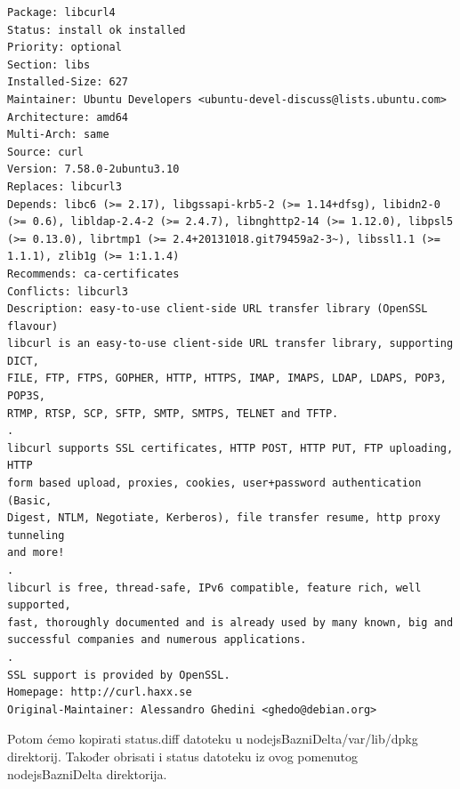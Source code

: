 \documentclass[12pt,vi]{mitthesis}
\begin{document}
\begin{lstlisting}[style=BashInputStyle]
Package: libcurl4
Status: install ok installed
Priority: optional
Section: libs
Installed-Size: 627
Maintainer: Ubuntu Developers <ubuntu-devel-discuss@lists.ubuntu.com>
Architecture: amd64
Multi-Arch: same
Source: curl
Version: 7.58.0-2ubuntu3.10
Replaces: libcurl3
Depends: libc6 (>= 2.17), libgssapi-krb5-2 (>= 1.14+dfsg), libidn2-0 (>= 0.6), libldap-2.4-2 (>= 2.4.7), libnghttp2-14 (>= 1.12.0), libpsl5 (>= 0.13.0), librtmp1 (>= 2.4+20131018.git79459a2-3~), libssl1.1 (>= 1.1.1), zlib1g (>= 1:1.1.4)
Recommends: ca-certificates
Conflicts: libcurl3
Description: easy-to-use client-side URL transfer library (OpenSSL flavour)
libcurl is an easy-to-use client-side URL transfer library, supporting DICT,
FILE, FTP, FTPS, GOPHER, HTTP, HTTPS, IMAP, IMAPS, LDAP, LDAPS, POP3, POP3S,
RTMP, RTSP, SCP, SFTP, SMTP, SMTPS, TELNET and TFTP.
.
libcurl supports SSL certificates, HTTP POST, HTTP PUT, FTP uploading, HTTP
form based upload, proxies, cookies, user+password authentication (Basic,
Digest, NTLM, Negotiate, Kerberos), file transfer resume, http proxy tunneling
and more!
.
libcurl is free, thread-safe, IPv6 compatible, feature rich, well supported,
fast, thoroughly documented and is already used by many known, big and
successful companies and numerous applications.
.
SSL support is provided by OpenSSL.
Homepage: http://curl.haxx.se
Original-Maintainer: Alessandro Ghedini <ghedo@debian.org>
\end{lstlisting}
\indent
Potom ćemo kopirati status.diff datoteku u nodejsBazniDelta/var/lib/dpkg direktorij. Također obrisati i status datoteku iz ovog pomenutog nodejsBazniDelta direktorija.\\
\end{document}

